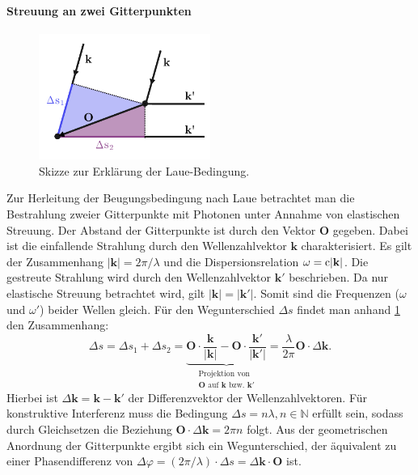 \paragraph{Streuung an zwei Gitterpunkten}
\begin{figure}
    \centering
    \includegraphics[width=0.5\textwidth]{../assets/theorie/lauebeugung}
    \caption{Skizze zur Erklärung der Laue-Bedingung. } \label{fig:laue}
\end{figure}
Zur Herleitung der Beugungsbedingung nach Laue betrachtet man die Bestrahlung zweier Gitterpunkte mit Photonen unter
Annahme von elastischen Streuung.
Der Abstand der Gitterpunkte ist durch den Vektor $\mathbf{O}$ gegeben.
Dabei ist die einfallende Strahlung durch den Wellenzahlvektor  $\mathbf{k}$ charakterisiert.
Es gilt der Zusammenhang $\lvert \mathbf{k} \rvert = 2 \pi / \lambda$ und die Dispersionsrelation
$\omega = \mathrm{c} \lvert \mathbf{k} \rvert$.
Die gestreute Strahlung wird durch den Wellenzahlvektor $\mathbf{k}'$ beschrieben.
Da nur elastische Streuung betrachtet wird, gilt $\lvert \mathbf{k} \rvert=\lvert \mathbf{k}' \rvert$.
Somit sind die Frequenzen ($\omega$ und $\omega'$) beider Wellen gleich.
Für den Wegunterschied $\Delta s$ findet man anhand \cref{fig:laue} den Zusammenhang:
\begin{equation}
    \Delta s = \Delta s_{1} + \Delta s_{2} = \underbrace{ \mathbf{O} \cdot \frac{\mathbf{k}}{\lvert \mathbf{k} \rvert }
    -\mathbf{O}\cdot \frac{\mathbf{k}'}{\lvert \mathbf{k}' \rvert}  }_{\substack{\text{Projektion von } \\ \mathbf{O} \text{ auf }
    \mathbf{k} \text{ bzw. }\mathbf{k'} }} =  \frac{\lambda}{2\pi} \mathbf{O}\cdot\Delta \mathbf{k}.
    \label{eq:laue}
\end{equation}
Hierbei ist $\Delta \mathbf{k} = \mathbf{k}-\mathbf{k}'$ der Differenzvektor der Wellenzahlvektoren.
Für konstruktive Interferenz muss die Bedingung $\Delta s = n \lambda, n \in \mathbb{N}$ erfüllt sein, sodass durch
Gleichsetzen die Beziehung $\mathbf{O}\cdot\Delta \mathbf{k} =2\pi n$ folgt.
Aus der geometrischen Anordnung der Gitterpunkte ergibt sich ein Wegunterschied, der äquivalent
zu einer Phasendifferenz von $\Delta\varphi=(2\pi / \lambda) \cdot \Delta s = \Delta \mathbf{k}\cdot \mathbf{O}$ ist.
\autocite[122-123]{Ashcroft}

